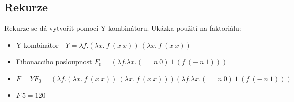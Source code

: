 \documentclass{szzclass}
\begin{document}
\subsection{Rekurze}
Rekurze se dá vytvořit pomocí Y-kombinátoru. Ukázka použití na faktoriálu:
\begin{itemize}
\item Y-kombinátor - $Y=\lambda f.(\lambda x.~f~(x~x))~(\lambda x.~f~(x~x))$
\item Fibonacciho posloupnost $F_0=(\lambda f.\lambda x.(=~n~0)~1~(f~(-~n~1)))$
\item $F = Y F_0 = (\lambda f.(\lambda x.~f~(x~x))~(\lambda x.~f~(x~x))) (\lambda f.\lambda x.(=~n~0)~1~(f~(-~n~1)))$
\item $F~5 = 120$
\end{itemize}
\end{document}
